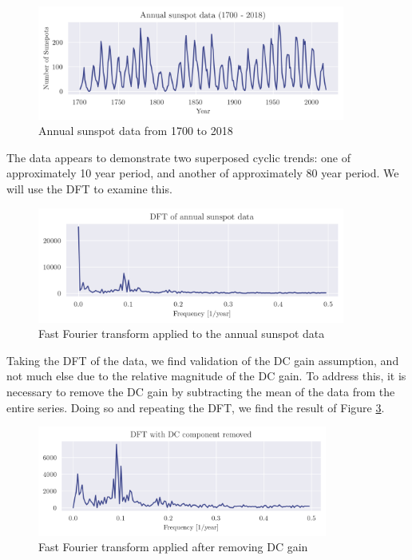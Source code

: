 \documentclass[a4paper, 11pt]{article}
\begin{document}
\begin{figure}[ht]
    \centering
    \includegraphics[width=0.9\textwidth]{images/q8_timeseries.png}
    \caption{Annual sunspot data from 1700 to 2018}
    \label{fig:q9_timeseries}
\end{figure}

The data appears to demonstrate two superposed cyclic trends: one of
approximately 10 year period, and another of approximately 80 year period. We
will use the DFT to examine this.

\begin{figure}[ht]
    \centering
    \includegraphics[width=0.9\textwidth]{images/q8_rawdft.png}
    \caption{Fast Fourier transform applied to the annual sunspot data}
    \label{fig:q8_rawdft}
\end{figure}

Taking the DFT of the data, we find validation of the DC gain assumption, and
not much else due to the relative magnitude of the DC gain. To address this, it
is necessary to remove the DC gain by subtracting the mean of the data from the
entire series. Doing so and repeating the DFT, we find the result of Figure
\ref{fig:q8_nodcdft}.

\newpage

\begin{figure}[ht]
    \centering
    \includegraphics[width=0.85\textwidth]{images/q8_nodcdft.png}
    \caption{Fast Fourier transform applied after removing DC gain}
    \label{fig:q8_nodcdft}
\end{figure}
\end{document}
